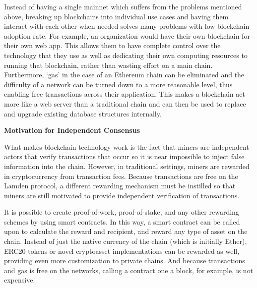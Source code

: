 \documentclass{%
	article}
\begin{document}
Instead of having a single mainnet which suffers from the problems mentioned above, breaking up blockchains into individual use cases and having them interact with each other when needed solves many problems with low blockchain adoption rate. For example, an organization would have their own blockchain for their own web app. This allows them to have complete control over the technology that they use as well as dedicating their own computing resources to running that blockchain, rather than wasting effort on a main chain. Furthermore, ‘gas’ in the case of an Ethereum chain can be eliminated and the difficulty of a network can be turned down to a more reasonable level, thus enabling free transactions across their application. This makes a blockchain act more like a web server than a traditional chain and can then be used to replace and upgrade existing database structures internally.

\begin{center}
\textbf{Motivation for Independent Consensus}
\end{center}

What makes blockchain technology work is the fact that miners are independent actors that verify transactions that occur so it is near impossible to inject false information into the chain. However, in traditional settings, miners are rewarded in cryptocurrency from transaction fees. Because transactions are free on the Lamden protocol, a different rewarding mechanism must be instilled so that miners are still motivated to provide independent verification of transactions\cite{verifincent}.

It is possible to create proof-of-work, proof-of-stake, and any other rewarding schemes by using smart contracts. In this way, a smart contract can be called upon to calculate the reward and recipient, and reward any type of asset on the chain. Instead of just the native currency of the chain (which is initially Ether), ERC20 tokens or novel cryptoasset implementations can be rewarded as well, providing even more customization to private chains. And because transactions and gas is free on the networks, calling a contract one a block, for example, is not expensive.
\end{document}
